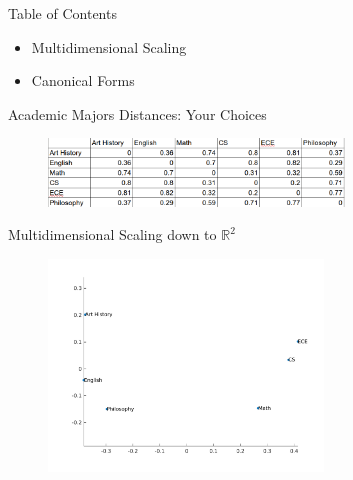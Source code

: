 \documentclass{beamer}
\begin{document}
\begin{frame}{Table of Contents}

\begin{itemize}[label=$\blacktriangleright$]
	\item Multidimensional Scaling
\end{itemize}

\begin{itemize}[label=$\vartriangleright$]
	\item Canonical Forms
\end{itemize}


\end{frame}

\begin{frame}{Academic Majors Distances: Your Choices}

\begin{figure}[t]
    \includegraphics[width=0.7\textwidth]{ClassChoices.png}
\end{figure}
\small Multidimensional Scaling down to $\mathbb{R}^2$
\begin{figure}[t]
    \includegraphics[width=0.65\textwidth]{MDSClasses.pdf}
\end{figure}


\end{frame}
\end{document}
